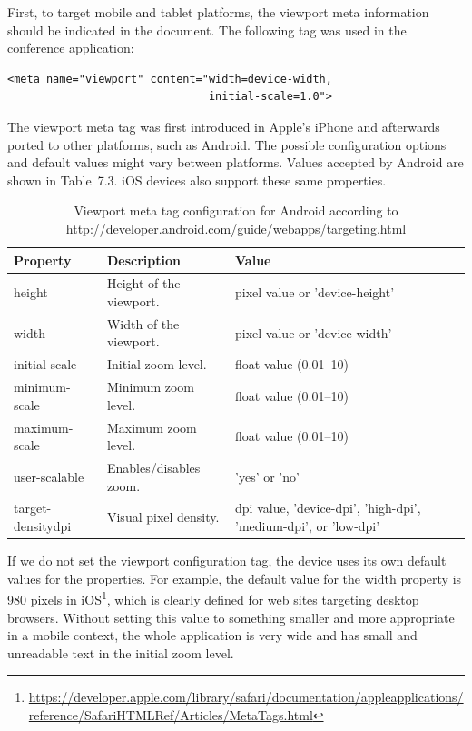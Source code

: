 First, to target mobile and tablet platforms, the viewport meta
information should be indicated in the document. The following tag was
used in the conference application:

\begin{verbatim}
<meta name="viewport" content="width=device-width,
                               initial-scale=1.0">
\end{verbatim}

The viewport meta tag was first introduced in Apple's iPhone and
afterwards ported to other platforms, such as Android. The possible
configuration options and default values might vary between
platforms. Values accepted by Android are shown in
Table~7.3\tableref. iOS devices also support these same properties.

\begin{table}
  \begin{tabular}{ l | l | p{5cm} }
    \textbf{Property} & \textbf{Description} & \textbf{Value} \\ \hline
    height & Height of the viewport. & pixel value or 'device-height' \\
    width & Width of the viewport. & pixel value or 'device-width' \\
    initial-scale & Initial zoom level. & float value (0.01--10) \\
    minimum-scale & Minimum zoom level. & float value (0.01--10) \\
    maximum-scale & Maximum zoom level. & float value (0.01--10) \\
    user-scalable & Enables/disables zoom. & 'yes' or 'no' \\
    target-densitydpi & Visual pixel density. & dpi value, 'device-dpi', 'high-dpi', 'medium-dpi', or 'low-dpi' \\
  \end{tabular}
  \label{table:viewport-meta}
  \caption{Viewport meta tag configuration for Android according to
    \url{http://developer.android.com/guide/webapps/targeting.html}}
\end{table}

If we do not set the viewport configuration tag, the device uses its
own default values for the properties. For example, the default value
for the width property is 980 pixels in
iOS\footnote{\url{https://developer.apple.com/library/safari/documentation/appleapplications/reference/SafariHTMLRef/Articles/MetaTags.html}},
which is clearly defined for web sites targeting desktop
browsers. Without setting this value to something smaller and more
appropriate in a mobile context, the whole application is very wide
and has small and unreadable text in the initial zoom level.

